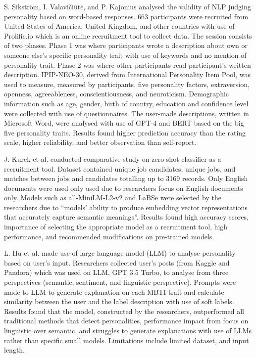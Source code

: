 \par S. Sikström, I. Valavičiūtė, and P. Kajonius \cite{s2025sikstrom} analysed the validity of NLP judging personality based on word-based responses. 663 participants were recruited from United States of America, United Kingdom, and other countries with use of Prolific.io which is an online recruitment tool to collect data. The session consists of two phases. Phase 1 was where participants wrote a description about own or someone else’s specific personality trait with use of keywords and no mention of personality trait. Phase 2 was where other participants read participant’s written description. IPIP-NEO-30, derived from International Personality Item Pool, was used to measure, measured by participants, five personality factors, extraversion, openness, agreeableness, conscientiousness, and neuroticism. Demographic information such as age, gender, birth of country, education and confidence level were collected with use of questionnaires. The user-made descriptions, written in Microsoft Word, were analysed with use of GPT-4 and BERT based on the big five personality traits. Results found higher prediction accuracy than the rating scale, higher reliability, and better observation than self-report. 

\par J. Kurek et al. \cite{j2024kurek} conducted comparative study on zero shot classifier as a recruitment tool. Dataset contained unique job candidates, unique jobs, and matches between jobs and candidates totalling up to 3169 records. Only English documents were used only used due to researchers focus on English documents only. Models such as all-MiniLM-L2-v2 and LaBSe were selected by the researchers due to “models’ ability to produce embedding vector representations that accurately capture semantic meanings”. Results found high accuracy scores, importance of selecting the appropriate model as a recruitment tool, high performance, and recommended modifications on pre-trained models. 

\par L. Hu et al. \cite{lhu2024llm} made use of large language model (LLM) to analyse personality based on user’s input. Researchers collected user’s posts (from Kaggle and Pandora) which was used on LLM, GPT 3.5 Turbo, to analyse from three perspectives (semantic, sentiment, and linguistic perspective). Prompts were made to LLM to generate explanation on each MBTI trait and calculate similarity between the user and the label description with use of soft labels. Results found that the model, constructed by the researchers, outperformed all traditional methods that detect personalities, performance impact from focus on linguistic over semantic, and struggles to generate explanations with use of LLMs rather than specific small models. Limitations include limited dataset, and input length.

